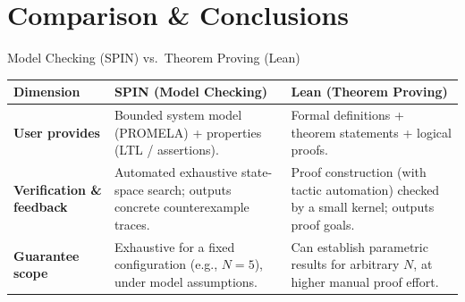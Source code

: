 \documentclass[aspectratio=169]{beamer}
\begin{document}
\section{Comparison \& Conclusions}

\begin{frame}{Model Checking (SPIN) vs.\ Theorem Proving (Lean)}
  \small
  \renewcommand{\arraystretch}{1.35}
  \begin{tabular}{@{}L{0.20\textwidth}L{0.365\textwidth}L{0.365\textwidth}@{}}
    \toprule
    \textbf{Dimension} & \textbf{SPIN (Model Checking)} & \textbf{Lean (Theorem Proving)} \\
    \midrule
    \textbf{User provides} & Bounded system model (PROMELA) + properties (LTL / assertions). & Formal definitions + theorem statements + logical proofs. \\
    \textbf{Verification \& feedback} & Automated exhaustive state-space search; outputs concrete counterexample traces. & Proof construction (with tactic automation) checked by a small kernel; outputs proof goals. \\
    \textbf{Guarantee scope} & Exhaustive for a fixed configuration (e.g., $N = 5$), under model assumptions. & Can establish parametric results for arbitrary $N$, at higher manual proof effort. \\
    \bottomrule
  \end{tabular}
  \vspace{0.7em}
  \begin{center}
  \end{center}
\end{frame}
\end{document}
